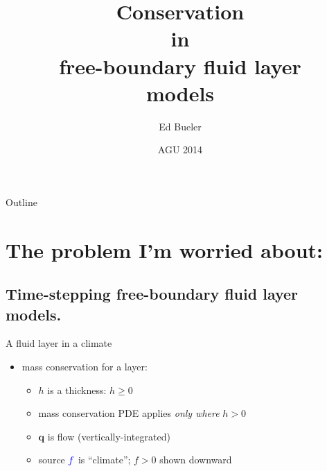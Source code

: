 \documentclass{beamer}
\title[Conservation in free-boundary layers] %
{Conservation \\ in \\ free-boundary fluid layer \\ models}
\author{Ed Bueler}
\institute[UAF] %
{
  Dept of Mathematics and Statistics, and Geophysical Institute\\
  University of Alaska Fairbanks%
}
\date{{\scriptsize AGU 2014}}
\newcommand\bq{\mathbf{q}}
\newcommand{\Div}{\nabla\cdot}
\begin{document}
\graphicspath{{../images/}{../../talks-public/commonfigs/}}

\begin{frame}
  \titlepage
\end{frame}

\begin{frame}{Outline}
  \tableofcontents
\end{frame}





\section{The problem I'm worried about:}

\subsection{Time-stepping free-boundary fluid layer models.}

\begin{frame}{A fluid layer in a climate}

\begin{center}
\end{center}

\vspace{-7mm}
  \begin{itemize}
  \item mass conservation for a layer:
     \only<1-4>{$$h_t + \Div\bq = f$$}
     \only<5>{$$h_t + \Div\bq = {\color{blue} f}$$}
    \begin{itemize}
    \vspace{-4mm}
    \item<2->[$\circ$] $h$ is a thickness: $h\ge 0$
    \item<3->[$\circ$] mass conservation PDE applies \emph{only where} $h>0$
    \item<4->[$\circ$] $\bq$ is flow (vertically-integrated)
    \item<5>[$\circ$] source ${\color{blue} f}$ is ``climate''; $f>0$ shown downward
    \end{itemize}
  \end{itemize}
\end{frame}
\end{document}

